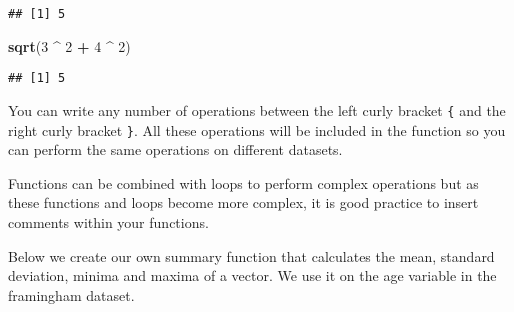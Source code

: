 \documentclass[
]{article}
\newenvironment{Shaded}{\begin{snugshade}}{\end{snugshade}}
\newcommand{\CommentTok}[1]{\textcolor[rgb]{0.56,0.35,0.01}{\textit{#1}}}
\newcommand{\ControlFlowTok}[1]{\textcolor[rgb]{0.13,0.29,0.53}{\textbf{#1}}}
\newcommand{\DecValTok}[1]{\textcolor[rgb]{0.00,0.00,0.81}{#1}}
\newcommand{\KeywordTok}[1]{\textcolor[rgb]{0.13,0.29,0.53}{\textbf{#1}}}
\newcommand{\NormalTok}[1]{#1}
\newcommand{\OperatorTok}[1]{\textcolor[rgb]{0.81,0.36,0.00}{\textbf{#1}}}
\newcommand{\StringTok}[1]{\textcolor[rgb]{0.31,0.60,0.02}{#1}}
\begin{document}
\begin{verbatim}
## [1] 5
\end{verbatim}

\begin{Shaded}
\begin{Highlighting}[]
\KeywordTok{sqrt}\NormalTok{(}\DecValTok{3} \OperatorTok{^}\StringTok{ }\DecValTok{2} \OperatorTok{+}\StringTok{ }\DecValTok{4} \OperatorTok{^}\StringTok{ }\DecValTok{2}\NormalTok{)}
\end{Highlighting}
\end{Shaded}

\begin{verbatim}
## [1] 5
\end{verbatim}

You can write any number of operations between the left curly bracket
\texttt{\{} and the right curly bracket \texttt{\}}. All these
operations will be included in the function so you can perform the same
operations on different datasets.

Functions can be combined with loops to perform complex operations but
as these functions and loops become more complex, it is good practice to
insert comments within your functions.

Below we create our own summary function that calculates the mean,
standard deviation, minima and maxima of a vector. We use it on the age
variable in the framingham dataset.

\begin{Shaded}
\end{Shaded}
\end{document}
